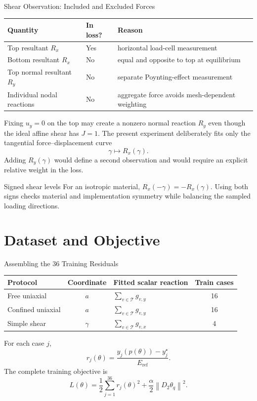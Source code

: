 \documentclass[aspectratio=169,10pt]{beamer}
\newcommand{\norm}[1]{\left\lVert #1\right\rVert}
\newcommand{\eref}{E_{\mathrm{ref}}}
\begin{document}
\begin{frame}{Shear Observation: Included and Excluded Forces}
  \small
  \begin{table}
    \centering
    \begin{tabular}{lll}
      \toprule
      Quantity & In loss? & Reason \\
      \midrule
      Top resultant $R_x$ & Yes &
      horizontal load-cell measurement \\
      Bottom resultant $R_x$ & No &
      equal and opposite to top at equilibrium \\
      Top normal resultant $R_y$ & No &
      separate Poynting-effect measurement \\
      Individual nodal reactions & No &
      aggregate force avoids mesh-dependent weighting \\
      \bottomrule
    \end{tabular}
  \end{table}

  Fixing $u_y=0$ on the top may create a nonzero normal reaction $R_y$ even
  though the ideal affine shear has $J=1$. The present experiment deliberately
  fits only the tangential force--displacement curve
  \[
    \gamma\longmapsto R_x(\gamma).
  \]
  Adding $R_y(\gamma)$ would define a second observation and would require an
  explicit relative weight in the loss.

  \begin{block}{Signed shear levels}
    For an isotropic material,
    $R_x(-\gamma)=-R_x(\gamma)$. Using both signs checks material and
    implementation symmetry while balancing the sampled loading directions.
  \end{block}
\end{frame}

\section{Dataset and Objective}

\begin{frame}{Assembling the 36 Training Residuals}
  \small
  \begin{table}
    \centering
    \begin{tabular}{lclc}
      \toprule
      Protocol & Coordinate & Fitted scalar reaction & Train cases \\
      \midrule
      Free uniaxial & $a$ &
      $\displaystyle\sum_{v\in\mathcal T}g_{v,y}$ & 16 \\
      Confined uniaxial & $a$ &
      $\displaystyle\sum_{v\in\mathcal T}g_{v,y}$ & 16 \\
      Simple shear & $\gamma$ &
      $\displaystyle\sum_{v\in\mathcal T}g_{v,x}$ & 4 \\
      \bottomrule
    \end{tabular}
  \end{table}

  For each case $j$,
  \[
    r_j(\theta)
    =
    \frac{y_j(p(\theta))-y_j^\star}{\eref}.
  \]
  The complete training objective is
  \[
    \boxed{
      L(\theta)
      =
      \frac12\sum_{j=1}^{36}r_j(\theta)^2
      +
      \frac{\alpha}{2}\norm{D_2\theta_q}^2
    }.
  \]
\end{frame}
\end{document}
